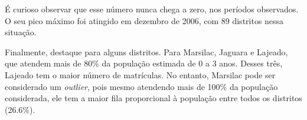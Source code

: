 É curioso observar que esse número nunca chega a zero, nos períodos observados. O seu pico máximo foi atingido em dezembro de 2006, com 89 distritos nessa situação. 

Finalmente, destaque para alguns distritos. Para Marsilac, Jaguara e Lajeado, que atendem mais de 80\% da população estimada de 0 a 3 anos. Desses três, Lajeado tem o maior número de matrículas. No entanto, Marsilac pode ser considerado um \textit{outlier}, pois mesmo atendendo mais de 100\% da população considerada, ele tem a maior fila proporcional à população entre todos os distritos (26.6\%).

